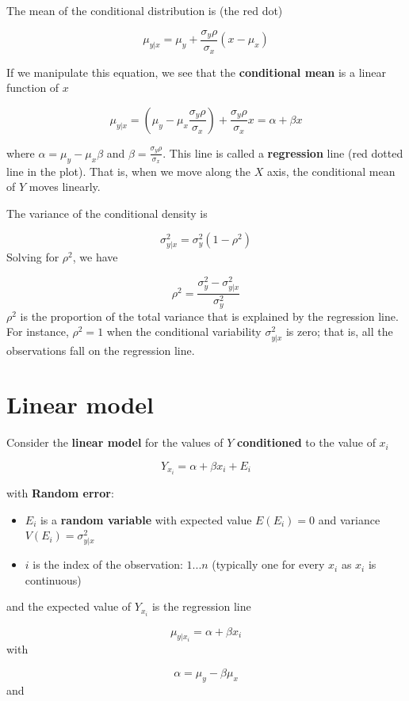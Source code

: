 \documentclass[
]{book}
\begin{document}
The mean of the conditional distribution is (the red dot)

\[\mu_{y|x}=\mu_y+\frac{\sigma_y\rho}{\sigma_x}(x-\mu_x)\]

If we manipulate this equation, we see that the \textbf{conditional mean} is a linear function of \(x\)

\[\mu_{y|x}=(\mu_y-\mu_x \frac{\sigma_y\rho}{\sigma_x})+\frac{\sigma_y \rho}{\sigma_x} x=\alpha + \beta x\]

where \(\alpha=\mu_y-\mu_x \beta\) and \(\beta=\frac{\sigma_y \rho}{\sigma_x}\). This line is called a \textbf{regression} line (red dotted line in the plot). That is, when we move along the \(X\) axis, the conditional mean of \(Y\) moves linearly.

The variance of the conditional density is

\[\sigma^2_{y|x}= \sigma_y^2(1-\rho^2)\]
Solving for \(\rho^2\), we have

\[\rho^2=\frac{\sigma_y^2-\sigma^2_{y|x}}{\sigma_y^2} \]
\(\rho^2\) is the proportion of the total variance that is explained by the regression line. For instance, \(\rho^2=1\) when the conditional variability \(\sigma^2_{y|x}\) is zero; that is, all the observations fall on the regression line.

\hypertarget{linear-model-3}{%
\section{Linear model}\label{linear-model-3}}

Consider the \textbf{linear model} for the values of \(Y\) \textbf{conditioned} to the value of \(x_i\)

\[Y_{x_i} = \alpha + \beta x_i +E_{i}\]

with \textbf{Random error}:

\begin{itemize}
\item
  \(E_{i}\) is a \textbf{random variable} with expected value \(E(E_{i})=0\) and variance \(V(E_{i})=\sigma_{y|x}^2\)
\item
  \(i\) is the index of the observation: \(1...n\) (typically one for every \(x_i\) as \(x_i\) is continuous)
\end{itemize}

and the expected value of \(Y_{x_i}\) is the regression line

\[\mu_{y|x_i}=\alpha + \beta x_i\]
with

\[\alpha=\mu_y-\beta\mu_x\]
and
\end{document}
